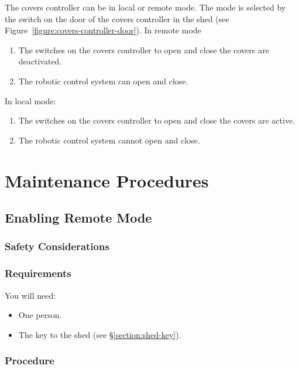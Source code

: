 
The covers controller can be in local or remote mode. The mode is selected by the switch on the door of the covers controller in the shed (see Figure~\ref{figure:covers-controller-door}). In remote mode

\begin{enumerate}
\item
The switches on the covers controller to open and close the covers are deactivated.
\item
The robotic control system can open and close.
\end{enumerate}

In local mode:

\begin{enumerate}
\item
The switches on the covers controller to open and close the covers are active.
\item
The robotic control system cannot open and close.
\end{enumerate}

\section{Maintenance Procedures}

\subsection{Enabling Remote Mode}

\subsubsection{Safety Considerations}


\subsubsection{Requirements}

You will need:
\begin{itemize}
\item One person.
\item The key to the shed (see \S\ref{section:shed-key}).
\end{itemize}

\subsubsection{Procedure}

